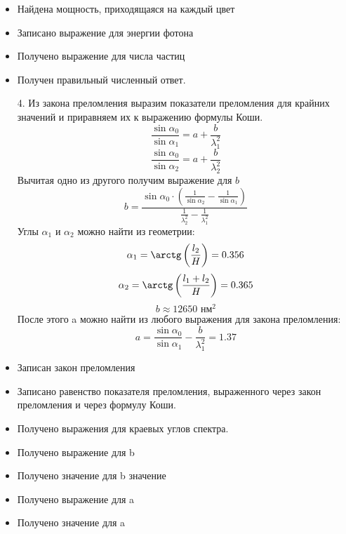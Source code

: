     \additionalCriteria
    \begin{itemize}
    \item Найдена мощность, приходящаяся на каждый цвет
    \item Записано выражение для энергии фотона
    \item Получено выражение для числа частиц
    \item Получен правильный численный ответ.
    \end{itemize}
    \begin{enumerate}
    \item [4.] Из закона преломления выразим показатели преломления для крайних значений и приравняем их к выражению формулы Коши.
    $$\frac{\sin{\alpha_0}}{\sin{\alpha_1}}=a+\frac{b}{\lambda_1^2}$$
    $$\frac{\sin{\alpha_0}}{\sin{\alpha_2}}=a+\frac{b}{\lambda_2^2}$$
    Вычитая одно из другого получим выражение для $b$
    $$b=\frac{\sin{\alpha_0}\cdot\left(\frac{1}{\sin{\alpha_2}}-\frac{1}{\sin{\alpha_1}}\right)}{\frac{1}{\lambda_2^2}-\frac{1}{\lambda_1^2}}$$
    Углы $\alpha_1$ и $\alpha_2$ можно найти из геометрии:
    $$\alpha_1=\arctg\left(\frac{l_2}{H}\right)=0.356$$
    $$\alpha_2=\arctg\left(\frac{l_1+l_2}{H}\right)=0.365$$
    $$b\approx12650\text{ нм}^2$$
    После этого a можно найти из любого выражения для закона преломления:	
    $$a=\frac{\sin{\alpha_0}}{\sin{\alpha_1}}-\frac{b}{\lambda_1^2}=1.37$$
    \end{enumerate}
    \additionalCriteria
    \begin{itemize}
    \item Записан закон преломления 
    \item Записано равенство показателя преломления, выраженного через закон преломления и через формулу Коши.
    \item Получено выражения для краевых углов спектра.
    \item Получено выражение для b
    \item Получено значение для b значение
    \item Получено выражение для a
    \item Получено значение для a
    \end{itemize}
    
